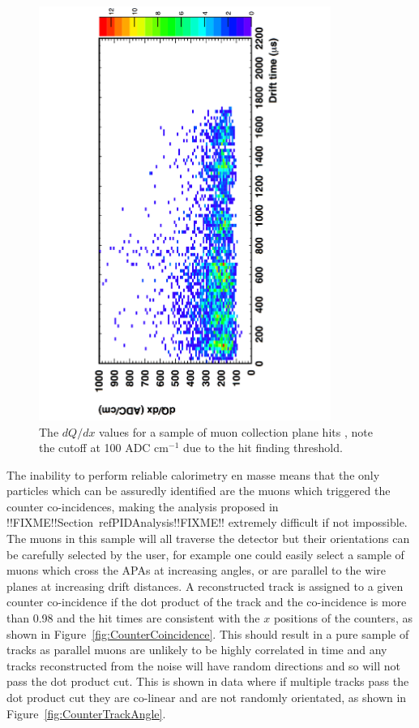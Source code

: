 \begin{figure}[h!]
  \centering
  \includegraphics[width=0.85\textwidth]{TingjunLifetime}
  \caption[$dQ/dx$ in the 35 ton as a function of drift time]
          {The $dQ/dx$ values for a sample of muon collection plane hits \citep{TingjunLifetime}, note the cutoff at 100 ADC cm$^{-1}$ due to the hit finding threshold.}
  \label{fig:TingjunLifetime}
\end{figure}  

The inability to perform reliable calorimetry en masse means that the only particles which can be assuredly identified are the muons which triggered the counter co-incidences, making the analysis proposed in !!FIXME!!Section~ref{PIDAnalysis}!!FIXME!! extremely difficult if not impossible. The muons in this sample will all traverse the detector but their orientations can be carefully selected by the user, for example one could easily select a sample of muons which cross the APAs at increasing angles, or are parallel to the wire planes at increasing drift distances. A reconstructed track is assigned to a given counter co-incidence if the dot product of the track and the co-incidence is more than 0.98 and the hit times are consistent with the $x$ positions of the counters, as shown in Figure~\ref{fig:CounterCoincidence}. This should result in a pure sample of tracks as parallel muons are unlikely to be highly correlated in time and any tracks reconstructed from the noise will have random directions and so will not pass the dot product cut. This is shown in data where if multiple tracks pass the dot product cut they are co-linear and are not randomly orientated, as shown in Figure~\ref{fig:CounterTrackAngle}. \\

